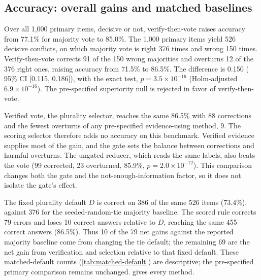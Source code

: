 \subsection{Accuracy: overall gains and matched baselines}
\label{sec:overturn-results}

Over all 1,000 primary items, decisive or not, verify-then-vote raises accuracy from 77.1\% for majority vote to 85.0\%. The 1,000 primary items yield 526 decisive conflicts, on which majority vote is right 376 times and wrong 150 times. Verify-then-vote corrects 91 of the 150 wrong majorities and overturns 12 of the 376 right ones, raising accuracy from 71.5\% to 86.5\%. The difference is 0.150 (\citet{newcombe1998paired} 95\% CI [0.115, 0.186]), with the exact \citet{mcnemar1947note} test, $p = 3.5 \times 10^{-16}$ (Holm-adjusted $6.9 \times 10^{-16}$). The pre-specified superiority null is rejected in favor of verify-then-vote.

Verified vote, the plurality selector, reaches the same 86.5\% with 88 corrections and the fewest overturns of any pre-specified evidence-using method, 9. The scoring selector therefore adds no accuracy on this benchmark. Verified evidence supplies most of the gain, and the gate sets the balance between corrections and harmful overturns. The ungated reducer, which reads the same labels, also beats the vote (99 corrected, 23 overturned, 85.9\%, $p = 2.0 \times 10^{-12}$). This comparison changes both the gate and the not-enough-information factor, so it does not isolate the gate's effect.

The fixed plurality default $D$ is correct on 386 of the same 526 items (73.4\%), against 376 for the seeded-random-tie majority baseline. The scored rule corrects 79 errors and loses 10 correct answers relative to $D$, reaching the same 455 correct answers (86.5\%). Thus 10 of the 79 net gains against the reported majority baseline come from changing the tie default; the remaining 69 are the net gain from verification and selection relative to that fixed default. These matched-default counts (\cref{tab:matched-default}) are descriptive; the pre-specified primary comparison remains unchanged.  gives every method.

